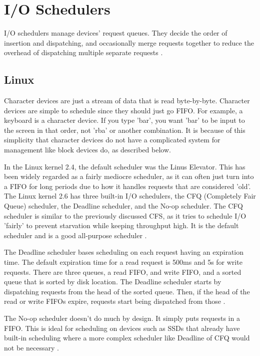 \documentclass[10pt,draftclsnofoot,onecolumn,journal,compsoc]{IEEEtran}
\begin{document}
\section{I/O Schedulers}
I/O schedulers manage devices' request queues. They decide the order of insertion and dispatching, and occasionally merge requests together to reduce the overhead of dispatching multiple separate requests \cite{linux_proc}.

\subsection{Linux}
Character devices are just a stream of data that is read byte-by-byte. Character devices are simple to schedule since they should just go FIFO. For example, a keyboard is a character device. If you type 'bar', you want 'bar' to be input to the screen in that order, not 'rba' or another combination. It is because of this simplicity that character devices do not have a complicated system for management like block devices do, as described below. \cite{linux_proc}

In the Linux kernel 2.4, the default scheduler was the Linus Elevator. This has been widely regarded as a fairly mediocre scheduler, as it can often just turn into a FIFO for long periods due to how it handles requests that are considered 'old'. The Linux kernel 2.6 has three built-in I/O schedulers, the CFQ (Completely Fair Queue) scheduler, the Deadline scheduler, and the No-op scheduler. The CFQ scheduler is similar to the previously discussed CFS, as it tries to schedule I/O 'fairly' to prevent starvation while keeping throughput high. It is the default scheduler and is a good all-purpose scheduler \cite{linux_proc}. 

The Deadline scheduler bases scheduling on each request having an expiration time. The default expiration time for a read request is 500ms and 5s for write requests. There are three queues, a read FIFO, and write FIFO, and a sorted queue that is sorted by disk location. The Deadline scheduler starts by dispatching requests from the head of the sorted queue. Then, if the head of the read or write FIFOs expire, requests start being dispatched from those \cite{linux_proc}. 

The No-op scheduler doesn't do much by design. It simply puts requests in a FIFO. This is ideal for scheduling on devices such as SSDs that already have built-in scheduling where a more complex scheduler like Deadline of CFQ would not be necessary \cite{linux_proc}. 
\end{document}

